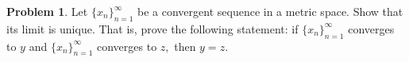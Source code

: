 \documentclass[12pt]{article}
\theoremstyle{definition}
\newtheorem{problem}{Problem}
\newenvironment{answer}{\par\medskip\bgroup\color{darkblue}}{\egroup\medskip}
\begin{document}
\begin{answer}
\end{answer}


\begin{problem}  %
Let $\{x_n\}_{n=1}^\infty$ be a convergent sequence in a metric
space.  Show that its limit is unique.  That is, prove the following statement:
if $\{x_n\}_{n=1}^\infty$ converges to $y$ and 
$\{x_n\}_{n=1}^\infty$ converges to $z,$ then $y=z$.
\end{problem}

\begin{answer}
\end{answer}
\end{document}
